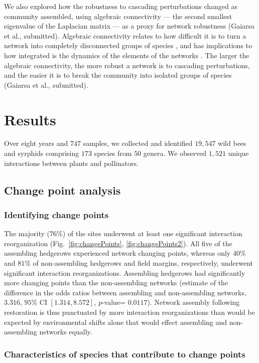 \documentclass[12pt]{article}
\begin{document}
We also explored how the robustness to cascading perturbations changed
as community assembled, using algebraic connectivity --- the second
smallest eigenvalue of the Laplacian matrix
\citep{fiedler1973algebraic} --- as a proxy for network robustness
(Gaiarsa et al., submitted). Algebraic connectivity relates to how
difficult it is to turn a network into completely disconnected groups
of species \citep{costa2007characterization}, and has implications to
how integrated is the dynamics of the elements of the networks
\citep{gibert2013spatial}. The larger the algebraic connectivity, the
more robust a network is to cascading perturbations, and the easier it
is to break the community into isolated groups of species (Gaiarsa et
al., submitted).


\section*{Results}
\label{sec:results}

Over eight years and $747$ samples, we collected and identified
$19,547$ wild bees and syrphids comprising $173$ species from $50$
genera. We observed $1,521$ unique interactions between plants and
pollinators.

\subsection*{Change point analysis}
\subsubsection*{Identifying change points}

The majority ($76\%$) of the sites underwent at least one significant
interaction reorganization (Fig.~\ref{fig:changePoints},
\ref{fig:changePoints2}).  All five of the assembling hedgerows
experienced network changing points, whereas only $40\%$ and $81\%$ of
non-assembling hedgerows and field margins, respectively, underwent
significant interaction reorganizations. Assembling hedgerows had
significantly more changing points than the non-assembling networks
(estimate of the difference in the odds ratios between assembling and
non-assembling networks, $3.316$, $95\%$ CI $[1.314, 8.572]$,
$p$-value= $0.0117$). Network assembly following restoration is thus
punctuated by more interaction reorganizations than would be expected
by environmental shifts alone that would effect assembling and
non-assembling networks equally.

\subsubsection*{Characteristics of species that contribute to change
  points}
\end{document}
